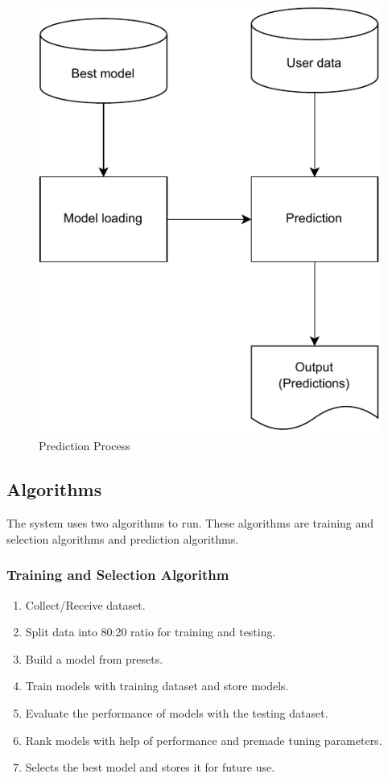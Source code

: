 \documentclass[a4paper,fleqn]{cas-dc}
\begin{document}
\begin{figure}[ht]
    \centering
    \includegraphics[width=0.6\columnwidth]{prediction.pdf}
    \caption{Prediction Process}
    \label{fig:prediction_process}
\end{figure}

\subsection{Algorithms}\label{subsec:algorithms}

The system uses two algorithms to run. These algorithms are training and selection algorithms and prediction algorithms.

\vspace{-0.5em}
\subsubsection*{Training and Selection Algorithm}\label{subsubsec:training_and_selection_algorithm}
\vspace{0.5em}
\begin{enumerate}
    \item Collect/Receive dataset.
    \item Split data into 80:20 ratio for training and testing.
    \item Build a model from presets.
    \item Train models with training dataset and store models.
    \item Evaluate the performance of models with the testing dataset.
    \item Rank models with help of performance and premade tuning parameters.
    \item Selects the best model and stores it for future use.
\end{enumerate}
\end{document}
